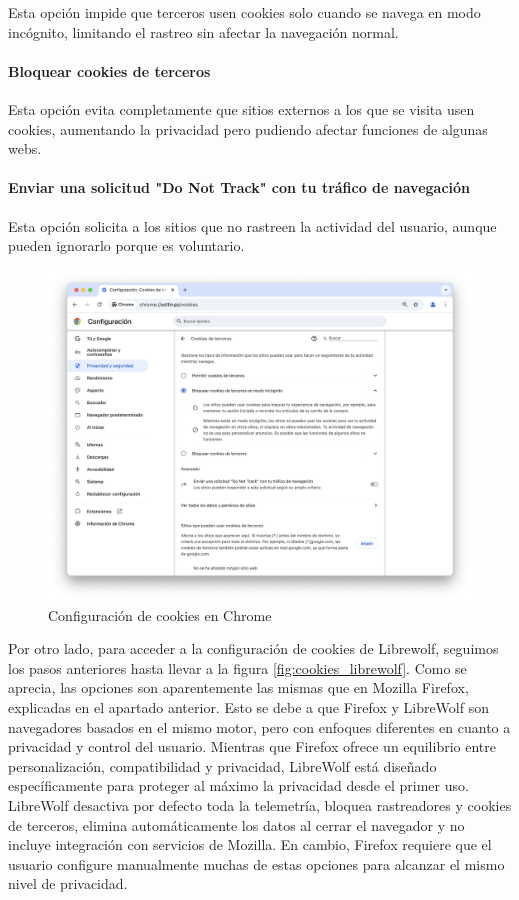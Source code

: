 Esta opción impide que terceros usen cookies solo cuando se navega en modo incógnito, limitando el rastreo sin afectar la navegación normal.

\paragraph{Bloquear cookies de terceros}

Esta opción evita completamente que sitios externos a los que se visita usen cookies, aumentando la privacidad pero pudiendo afectar funciones de algunas webs.

\paragraph{Enviar una solicitud "Do Not Track" con tu tráfico de navegación}

Esta opción solicita a los sitios que no rastreen la actividad del usuario, aunque pueden ignorarlo porque es voluntario.

\begin{figure}[H]   
    \centering
    \includegraphics[width=\textwidth]{cookies_chrome_ej14a.png}
    \caption{Configuración de cookies en Chrome}
    \label{fig:cookies_chrome}
\end{figure}

Por otro lado, para acceder a la configuración de cookies de Librewolf, seguimos los pasos anteriores hasta llevar a la figura \ref{fig:cookies_librewolf}. Como se aprecia, las opciones son aparentemente las mismas que en Mozilla Firefox, explicadas en el apartado anterior. Esto se debe a que Firefox y LibreWolf son navegadores basados en el mismo motor, pero con enfoques diferentes en cuanto a privacidad y control del usuario. Mientras que Firefox ofrece un equilibrio entre personalización, compatibilidad y privacidad, LibreWolf está diseñado específicamente para proteger al máximo la privacidad desde el primer uso. LibreWolf desactiva por defecto toda la telemetría, bloquea rastreadores y cookies de terceros, elimina automáticamente los datos al cerrar el navegador y no incluye integración con servicios de Mozilla. En cambio, Firefox requiere que el usuario configure manualmente muchas de estas opciones para alcanzar el mismo nivel de privacidad. 

